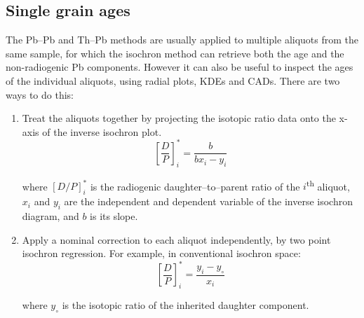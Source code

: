 \begin{refsection}
\section{Single grain ages}\label{sec:ThPbPbradial}

The Pb--Pb and Th--Pb methods are usually applied to multiple aliquots
from the same sample, for which the isochron method can retrieve both
the age and the non-radiogenic Pb components. However it can also be
useful to inspect the ages of the individual aliquots, using radial
plots, KDEs and CADs. There are two ways to do this:

\begin{enumerate}
  \item Treat the aliquots together by projecting the isotopic ratio
    data onto the x-axis of the inverse isochron plot.
    \begin{equation}
      \left[\frac{D}{P}\right]_i^\ast = \frac{b}{b x_i - y_i}
      \label{eq:DP*inverse}
    \end{equation}
    
    \noindent where $[D/P]_i^\ast$ is the radiogenic
    daughter--to--parent ratio of the $i$\textsuperscript{th} aliquot,
    $x_i$ and $y_i$ are the independent and dependent variable of the
    inverse isochron diagram, and $b$ is its slope.

  \item Apply a nominal correction to each aliquot independently, by
    two point isochron regression. For example, in conventional
    isochron space:
    \begin{equation}
      \left[\frac{D}{P}\right]_i^\ast = \frac{y_i - y_\circ}{x_i}
      \label{eq:DP*conventional}
    \end{equation}

    \noindent where $y_\circ$ is the isotopic ratio of the inherited
    daughter component.
\end{enumerate}


\end{refsection}
